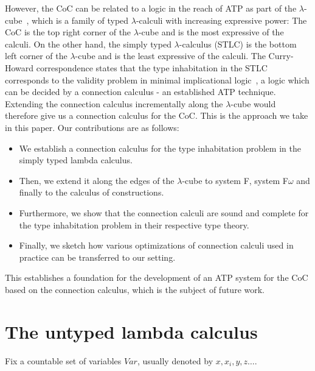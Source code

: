 \documentclass[11pt]{article}
\theoremstyle{definition}
\theoremstyle{definition}
\theoremstyle{definition}
\theoremstyle{definition}
\theoremstyle{definition}
\theoremstyle{definition}
\theoremstyle{definition}
\begin{document}
	However, the CoC can be related to a logic in the reach of ATP as part of the $\lambda$-cube~\cite{barendregt1991introduction}, which is a family of typed $\lambda$-calculi with increasing expressive power: The CoC is the top right corner of the $\lambda$-cube and is the most expressive of the calculi. On the other hand, the simply typed $\lambda$-calculus (STLC) is the bottom left corner of the $\lambda$-cube and is the least expressive of the calculi. The Curry-Howard correspondence states that the type inhabitation in the STLC corresponds to the validity problem in minimal implicational logic~\cite{de1995curry}, a logic which can be decided by a connection calculus - an established ATP technique. Extending the connection calculus incrementally along the $\lambda$-cube would therefore give us a connection calculus for the CoC. This is the approach we take in this paper. Our contributions are as follows:
	\begin{itemize}
		\item We establish a connection calculus for the type inhabitation problem in the simply typed lambda calculus.
		\item Then, we extend it along the edges of the $\lambda$-cube to system F, system F$\omega$ and finally to the calculus of constructions.
		\item Furthermore, we show that the connection calculi are sound and complete for the type inhabitation problem in their respective type theory.
		\item Finally, we sketch how various optimizations of connection calculi used in practice can be transferred to our setting.
	\end{itemize}
	This establishes a foundation for the development of an ATP system for the CoC based on the connection calculus, which is the subject of future work.



	\section{The untyped lambda calculus}

	Fix a countable set of variables $Var$, usually denoted by $x, x_i, y, z\dots$.
	
\end{document}

